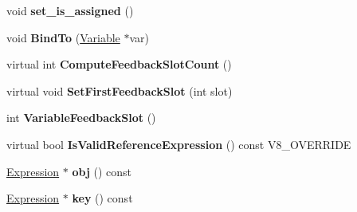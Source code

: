 \begin{DoxyCompactItemize}
\item 
\hypertarget{classv8_1_1internal_1_1_v8___f_i_n_a_l_a3e8a172d6d4ff08677bd0fd04ec8b8a4}{}void {\bfseries set\+\_\+is\+\_\+assigned} ()\label{classv8_1_1internal_1_1_v8___f_i_n_a_l_a3e8a172d6d4ff08677bd0fd04ec8b8a4}

\item 
\hypertarget{classv8_1_1internal_1_1_v8___f_i_n_a_l_ad33359faa4a108b6f6771e3c0f4f22d2}{}void {\bfseries Bind\+To} (\hyperlink{classv8_1_1internal_1_1_variable}{Variable} $\ast$var)\label{classv8_1_1internal_1_1_v8___f_i_n_a_l_ad33359faa4a108b6f6771e3c0f4f22d2}

\item 
\hypertarget{classv8_1_1internal_1_1_v8___f_i_n_a_l_ad227c78a22ace5712b786085f6666403}{}virtual int {\bfseries Compute\+Feedback\+Slot\+Count} ()\label{classv8_1_1internal_1_1_v8___f_i_n_a_l_ad227c78a22ace5712b786085f6666403}

\item 
\hypertarget{classv8_1_1internal_1_1_v8___f_i_n_a_l_a9d78506d71ca20df81cdbc154ce35f88}{}virtual void {\bfseries Set\+First\+Feedback\+Slot} (int slot)\label{classv8_1_1internal_1_1_v8___f_i_n_a_l_a9d78506d71ca20df81cdbc154ce35f88}

\item 
\hypertarget{classv8_1_1internal_1_1_v8___f_i_n_a_l_a4bd583137822992b0edbd22b8ae732a4}{}int {\bfseries Variable\+Feedback\+Slot} ()\label{classv8_1_1internal_1_1_v8___f_i_n_a_l_a4bd583137822992b0edbd22b8ae732a4}

\item 
\hypertarget{classv8_1_1internal_1_1_v8___f_i_n_a_l_ae124afe44a9598a41ff625ccfb1a524c}{}virtual bool {\bfseries Is\+Valid\+Reference\+Expression} () const V8\+\_\+\+O\+V\+E\+R\+R\+I\+D\+E\label{classv8_1_1internal_1_1_v8___f_i_n_a_l_ae124afe44a9598a41ff625ccfb1a524c}

\item 
\hypertarget{classv8_1_1internal_1_1_v8___f_i_n_a_l_a04f395ded85372b06daa4063aa5d07f6}{}\hyperlink{classv8_1_1internal_1_1_expression}{Expression} $\ast$ {\bfseries obj} () const \label{classv8_1_1internal_1_1_v8___f_i_n_a_l_a04f395ded85372b06daa4063aa5d07f6}

\item 
\hypertarget{classv8_1_1internal_1_1_v8___f_i_n_a_l_aad68c2d7cd5abe59e00553f742c93efb}{}\hyperlink{classv8_1_1internal_1_1_expression}{Expression} $\ast$ {\bfseries key} () const \label{classv8_1_1internal_1_1_v8___f_i_n_a_l_aad68c2d7cd5abe59e00553f742c93efb}


\end{DoxyCompactItemize}
